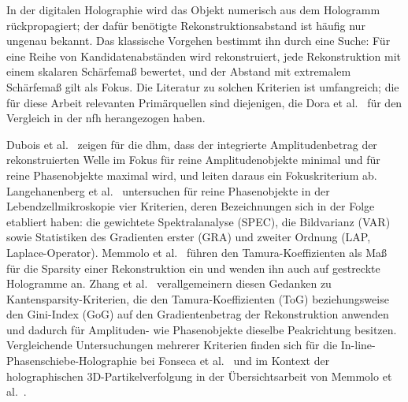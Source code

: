 In der digitalen Holographie wird das Objekt numerisch aus dem Hologramm
rückpropagiert; der dafür benötigte Rekonstruktionsabstand ist häufig nur
ungenau bekannt. Das klassische Vorgehen bestimmt ihn durch eine Suche: Für
eine Reihe von Kandidatenabständen wird rekonstruiert, jede Rekonstruktion
mit einem skalaren Schärfemaß bewertet, und der Abstand mit extremalem
Schärfemaß gilt als Fokus. Die Literatur zu solchen Kriterien ist umfangreich;
die für diese Arbeit relevanten Primärquellen sind diejenigen, die
Dora et al.\ \cite{dora2025autofocus} für den Vergleich in der \ac{nfh}
herangezogen haben.

Dubois et al.\ \cite{dubois2006focus} zeigen für die \ac{dhm}, dass der integrierte
Amplitudenbetrag der rekonstruierten Welle im Fokus für reine
Amplitudenobjekte minimal und für reine Phasenobjekte maximal wird, und
leiten daraus ein Fokuskriterium ab. Langehanenberg et al.\
\cite{langehanenberg2008autofocusing} untersuchen für reine Phasenobjekte in der Lebendzellmikroskopie vier
Kriterien, deren Bezeichnungen sich in der Folge etabliert haben: die
gewichtete Spektralanalyse (SPEC), die Bildvarianz (VAR) sowie Statistiken
des Gradienten erster (GRA) und zweiter Ordnung (LAP, Laplace-Operator).
Memmolo et al.\ \cite{memmolo2011automatic} führen den Tamura-Koeffizienten als Maß für die
Sparsity einer Rekonstruktion ein und wenden ihn auch auf gestreckte
Hologramme an. Zhang et al.\ \cite{zhang2017edge} verallgemeinern diesen Gedanken zu
Kantensparsity-Kriterien, die den Tamura-Koeffizienten (ToG) beziehungsweise
den Gini-Index (GoG) auf den Gradientenbetrag der Rekonstruktion anwenden und
dadurch für Amplituden- wie Phasenobjekte dieselbe Peakrichtung besitzen.
Vergleichende Untersuchungen mehrerer Kriterien finden sich für die
In-line-Phasenschiebe-Holographie bei Fonseca et al.\ \cite{fonseca2016comparative}
und im Kontext der holographischen 3D-Partikelverfolgung in der
Übersichtsarbeit von Memmolo et al.\ \cite{memmolo2015recent}.

